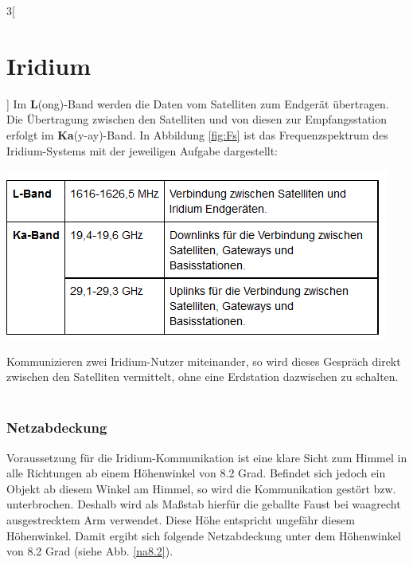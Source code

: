 \begin{multicols}{3}[\section{Iridium}]
Im \textbf{L}(ong)-Band werden die Daten vom Satelliten zum Endgerät übertragen. Die Übertragung zwischen den Satelliten und von diesen zur Empfangsstation erfolgt im \textbf{Ka}(y-ay)-Band. In Abbildung \ref{fig:Fs} ist das Frequenzspektrum des Iridium-Systems mit der jeweiligen Aufgabe dargestellt: 

\begin{Figure}
	\includegraphics[width=\linewidth]{Kapitel/Iridium/Grafiken/band.png}
	\label{fig:Fs}
\end{Figure}

Kommunizieren zwei Iridium-Nutzer  miteinander, so wird dieses Gespräch direkt zwischen den Satelliten vermittelt, ohne eine Erdstation dazwischen zu schalten. ~\cite{I1, I4}



\subsubsection*{Netzabdeckung}
Voraussetzung für die Iridium-Kommunikation ist eine klare Sicht zum Himmel in alle Richtungen ab einem Höhenwinkel von 8.2 Grad. Befindet sich jedoch ein Objekt ab diesem Winkel am Himmel, so wird die Kommunikation gestört bzw. unterbrochen. Deshalb wird als Maßstab hierfür die geballte Faust bei waagrecht ausgestrecktem Arm verwendet. Diese Höhe entspricht ungefähr diesem Höhenwinkel. Damit ergibt sich folgende  Netzabdeckung unter dem Höhenwinkel von 8.2 Grad (siehe Abb. \ref{na8.2}).


\end{multicols}
